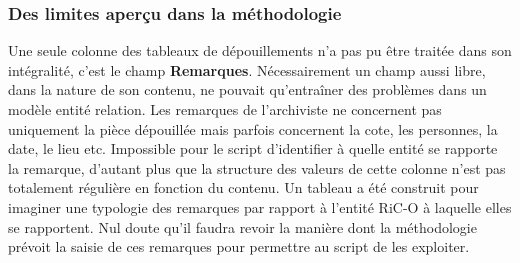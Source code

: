 \subsubsection{Des limites aperçu dans la méthodologie}
Une seule colonne des tableaux de dépouillements n'a pas pu être traitée dans son intégralité, c'est le champ \textbf{Remarques}. Nécessairement un champ aussi libre, dans la nature de son contenu, ne pouvait qu'entraîner des problèmes dans un modèle entité relation. Les remarques de l'archiviste ne concernent pas uniquement la pièce dépouillée mais parfois concernent la cote, les personnes, la date, le lieu etc. Impossible pour le script d'identifier à quelle entité se rapporte la remarque, d'autant plus que la structure des valeurs de cette colonne n'est pas totalement régulière en fonction du contenu. Un tableau a été construit pour imaginer une typologie des remarques par rapport à l'entité RiC-O à laquelle elles se rapportent. Nul doute qu'il faudra revoir la manière dont la méthodologie prévoit la saisie de ces remarques pour permettre au script de les exploiter. 